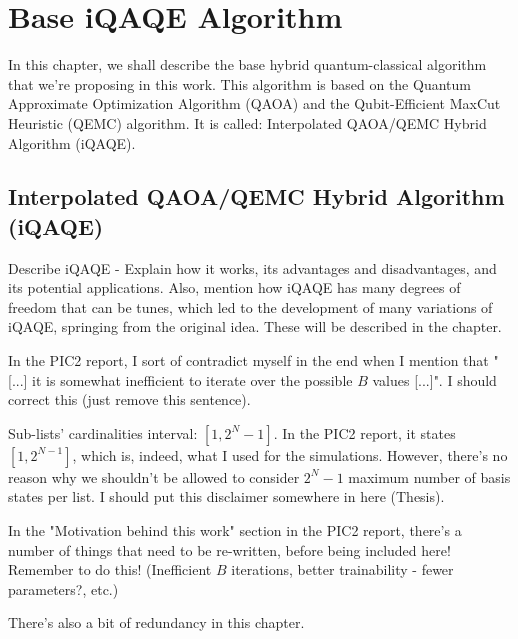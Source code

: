 
\chapter{Base iQAQE Algorithm}
\label{chapter:Base Algorithm}

In this chapter, we shall describe the base hybrid quantum-classical algorithm that we're proposing in this work. This algorithm is based on the Quantum Approximate Optimization Algorithm (QAOA) and the Qubit-Efficient MaxCut Heuristic (QEMC) algorithm.  It is called: Interpolated QAOA/QEMC Hybrid Algorithm (iQAQE).

\section{Interpolated QAOA/QEMC Hybrid Algorithm (iQAQE)}
\label{section:iQAQE}

Describe iQAQE - Explain how it works, its advantages and disadvantages, and its potential applications. Also, mention how iQAQE has many degrees of freedom that can be tunes, which led to the development of many variations of iQAQE, springing from the original idea. These will be described in the  chapter.

In the PIC2 report, I sort of contradict myself in the end when I mention that "[...] it is somewhat inefficient to iterate over the possible $B$ values [...]". I should correct this (just remove this sentence).

Sub-lists' cardinalities interval: $[1, 2^N -1]$. In the PIC2 report, it states $[1, 2^{N -1}]$, which is, indeed, what I used for the simulations. However, there's no reason why we shouldn't be allowed to consider $2^N -1$ maximum number of basis states per list. I should put this disclaimer somewhere in here (Thesis).

In the "Motivation behind this work" section in the PIC2 report, there's a number of things that need to be re-written, before being included here! Remember to do this! (Inefficient $B$ iterations, better trainability - fewer parameters?, etc.)

There's also a bit of redundancy in this chapter.